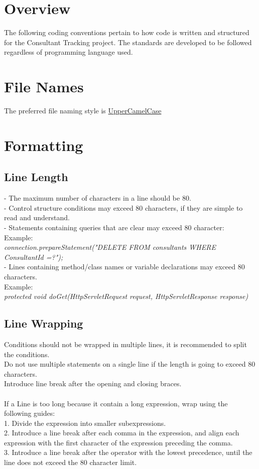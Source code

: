 \documentclass[a4paper,12pt]{report}
\begin{document}
\section{Overview}
The following coding conventions pertain to how code is written and structured for the Consultant Tracking project. The standards are developed to be followed regardless of programming language used.

\section{File Names}
The preferred file naming style is \underline{UpperCamelCase}

\section{Formatting}
\subsection{Line Length} 
	- The maximum number of characters in a line should be 80.\\
	- Control structure conditions may exceed 80 characters, if they are simple to read and understand.\\
	- Statements containing queries that are clear may exceed 80 character:\\
	Example:\\ \textit{ connection.prepareStatement("DELETE FROM consultants WHERE ConsultantId =?");}  \\
	- Lines containing method/class names or variable declarations may exceed 80 characters.\\
	Example:\\ \textit{protected void doGet(HttpServletRequest request, HttpServletResponse response)}
\subsection{Line Wrapping}
	Conditions should not be wrapped in multiple lines, it is recommended to split the conditions.\\
	Do not use multiple statements on a single line if the length is going to exceed 80 characters.\\
	Introduce line break after the opening and closing braces.\\\\
	If a Line is too long because it contain a long expression, wrap using the following guides:\\
	1. Divide the expression into smaller subexpressions.\\
	2. Introduce a line break after each comma in the expression, and align each expression with the first character of the expression preceding the comma.\\
	3. Introduce a line break after the operator with the lowest precedence, until the line does not exceed the 80 character limit.
\end{document}
